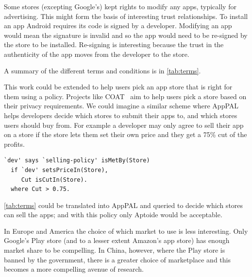 \documentclass[a4paper]{scrartcl}
\begin{document}
Some stores (excepting Google's) kept rights to modify any apps, typically for advertising.
This might form the basis of interesting trust relationships.
To install an app Android requires its code is signed by a developer.
Modifying an app would mean the signature is invalid and so the app would need to be re-signed by the store to be installed.
Re-signing is interesting because the trust in the authenticity of the app moves from the developer to the store.

A summary of the different terms and conditions is in \autoref{tab:terms}.

This work could be extended to help users pick an app store that is right for them using a policy.
Projects like COAT~\citep{Fernandez:5lFoplRA} aim to help users pick a store based on their privacy requirements.
We could imagine a similar scheme where AppPAL helps developers decide which stores to submit their apps to,
  and which stores users should buy from.
For example a developer may only agree to sell their app on a store if the store lets them set their own price and they get a 75\% cut of the profits.
\begin{lstlisting}
`dev' says `selling-policy' isMetBy(Store)
  if `dev' setsPriceIn(Store),
     Cut isCutIn(Store).
  where Cut > 0.75.
\end{lstlisting}
\autoref{tab:terms} could be translated into AppPAL and queried to decide which stores can sell the apps; and with this policy only Aptoide would be acceptable.

In Europe and America the choice of which market to use is less interesting.
Only Google's Play store (and to a lesser extent Amazon's app store) has enough market share to be compelling.
In China, however, where the Play store is banned by the government, there is a greater choice of marketplace and this becomes a more compelling avenue of research.
\end{document}
